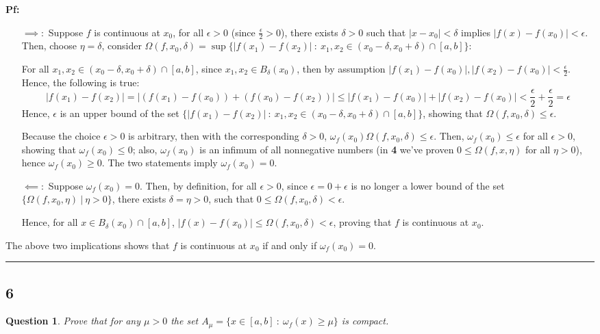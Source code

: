 \documentclass{article}
\newtheorem{question}{Question}
\begin{document}
\textbf{Pf:}

\begin{itemize}
    \item[$\implies:$] Suppose $f$ is continuous at $x_0$, for all $\epsilon>0$ (since $\frac{\epsilon}{2}>0$), there exists $\delta>0$ such that $|x-x_0|<\delta$ implies $|f(x)-f(x_0)|<\epsilon$.
    Then, choose $\eta=\delta$, consider $\Omega(f,x_0,\delta)=\sup\{|f(x_1)-f(x_2)|\ :\ x_1,x_2\in (x_0-\delta,x_0+\delta) \cap [a,b]\}$:

    For all $x_1,x_2\in (x_0-\delta,x_0+\delta)\cap [a,b]$, since $x_1,x_2\in B_\delta(x_0)$, then by assumption $|f(x_1)-f(x_0)|,|f(x_2)-f(x_0)|<\frac{\epsilon}{2}$. Hence, the following is true:
    $$|f(x_1)-f(x_2)| = |(f(x_1)-f(x_0))+(f(x_0)-f(x_2))| \leq |f(x_1)-f(x_0)|+|f(x_2)-f(x_0)|<\frac{\epsilon}{2}+\frac{\epsilon}{2}=\epsilon$$
    Hence, $\epsilon$ is an upper bound of the set $\{|f(x_1)-f(x_2)|\ :\ x_1,x_2\in (x_0-\delta,x_0+\delta) \cap [a,b]\}$, showing that $\Omega(f,x_0,\delta)\leq \epsilon$.

    \hfill

    Because the choice $\epsilon>0$ is arbitrary, then with the corresponding $\delta>0$, $\omega_f(x_0) \Omega(f,x_0,\delta)\leq \epsilon$. 
    Then, $\omega_f(x_0)\leq \epsilon$ for all $\epsilon>0$, showing that $\omega_f(x_0) \leq 0$;
    also, $\omega_f(x_0)$ is an infimum of all nonnegative numbers (in \textbf{4} we've proven $0 \leq \Omega(f,x,\eta)$ for all $\eta>0$),
    hence $\omega_f(x_0)\geq 0$. The two statements imply $\omega_f(x_0)=0$.
    
    \hfill

    \item[$\impliedby:$] Suppose $\omega_f(x_0)=0$. Then, by definition, for all $\epsilon>0$, since $\epsilon=0+\epsilon$ is no longer a lower bound of the set $\{\Omega(f,x_0,\eta)\ |\ \eta>0\}$,
    there exists $\delta = \eta>0$, such that $0\leq \Omega(f,x_0,\delta) < \epsilon$. 

    Hence, for all $x\in B_\delta(x_0)\cap [a,b]$, $|f(x)-f(x_0)| \leq \Omega(f,x_0,\delta)<\epsilon$, proving that $f$ is continuous at $x_0$.
\end{itemize}
The above two implications shows that $f$ is continuous at $x_0$ if and only if $\omega_f(x_0)=0$.

\hfill

\rule{15.5cm}{0.1mm}

\hfill

\subsection*{6}
\begin{myBox2}[]{}
    \begin{question}
        Prove that for any $\mu>0$ the set $A_\mu=\{x\in[a,b]\ :\ \omega_f(x)\geq \mu\}$ is
        compact.   
    \end{question}
\end{myBox2}
\end{document}
